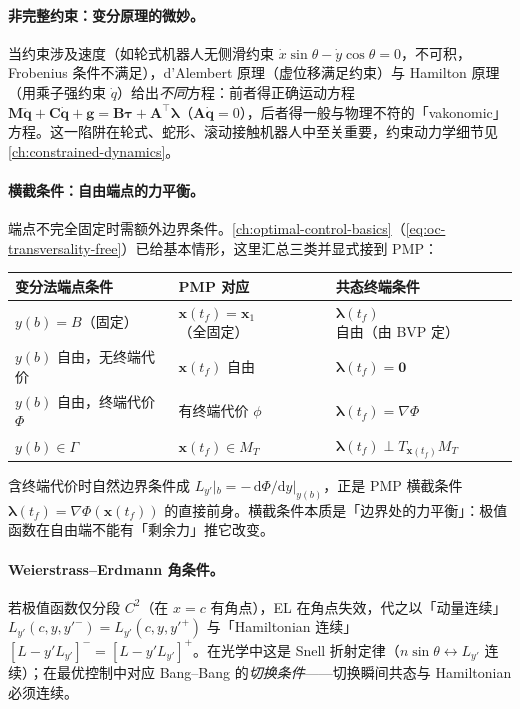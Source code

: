 \paragraph{非完整约束：变分原理的微妙。}
当约束涉及速度（如轮式机器人无侧滑约束 $\dot x\sin\theta-\dot y\cos\theta=0$，不可积，Frobenius 条件不满足），d'Alembert 原理（虚位移满足约束）与 Hamilton 原理（用乘子强约束 $\dot q$）给出\emph{不同}方程：前者得正确运动方程 $\mathbf M\ddot{\mathbf q}+\mathbf C\dot{\mathbf q}+\mathbf g=\mathbf B\boldsymbol\tau+\mathbf A^\top\boldsymbol\lambda$（$\mathbf A\dot{\mathbf q}=0$），后者得一般与物理不符的「vakonomic」方程。这一陷阱在轮式、蛇形、滚动接触机器人中至关重要，约束动力学细节见 \cref{ch:constrained-dynamics}。

\paragraph{横截条件：自由端点的力平衡。}
端点不完全固定时需额外边界条件。\cref{ch:optimal-control-basics}（\cref{eq:oc-transversality-free}）已给基本情形，这里汇总三类并显式接到 PMP：
\begin{center}\small
\begin{tabular}{lll}
\toprule
变分法端点条件 & PMP 对应 & 共态终端条件\\
\midrule
$y(b)=B$（固定） & $\mathbf x(t_f)=\mathbf x_1$（全固定） & $\boldsymbol\lambda(t_f)$ 自由（由 BVP 定）\\
$y(b)$ 自由，无终端代价 & $\mathbf x(t_f)$ 自由 & $\boldsymbol\lambda(t_f)=\mathbf 0$\\
$y(b)$ 自由，终端代价 $\Phi$ & 有终端代价 $\phi$ & $\boldsymbol\lambda(t_f)=\nabla\Phi$\\
$y(b)\in\Gamma$ & $\mathbf x(t_f)\in M_T$ & $\boldsymbol\lambda(t_f)\perp T_{\mathbf x(t_f)}M_T$\\
\bottomrule
\end{tabular}
\end{center}
含终端代价时自然边界条件成 $L_{y'}|_b=-\,\mathrm d\Phi/\mathrm dy|_{y(b)}$，正是 PMP 横截条件 $\boldsymbol\lambda(t_f)=\nabla\Phi(\mathbf x(t_f))$ 的直接前身。横截条件本质是「边界处的力平衡」：极值函数在自由端不能有「剩余力」推它改变。

\paragraph{Weierstrass--Erdmann 角条件。}
若极值函数仅分段 $C^2$（在 $x=c$ 有角点），EL 在角点失效，代之以「动量连续」$L_{y'}(c,y,y'^-)=L_{y'}(c,y,y'^+)$ 与「Hamiltonian 连续」$[L-y'L_{y'}]^-=[L-y'L_{y'}]^+$。在光学中这是 Snell 折射定律（$n\sin\theta\leftrightarrow L_{y'}$ 连续）；在最优控制中对应 Bang--Bang 的\emph{切换条件}——切换瞬间共态与 Hamiltonian 必须连续。

